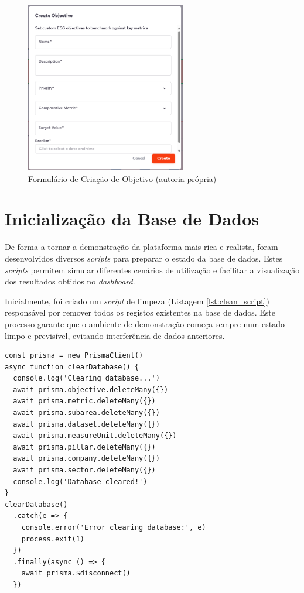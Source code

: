 \begin{figure}[H]
    \centering
    \includegraphics[width=2.75in,keepaspectratio]{frontmatter/assets/platform_prints/objetives/objective_creation.png}
    \caption{Formulário de Criação de Objetivo (autoria própria)}
    \label{fig:objective_creation}
\end{figure}

\section{Inicialização da Base de Dados}

De forma a tornar a demonstração da plataforma mais rica e realista, foram desenvolvidos diversos \textit{scripts} para preparar o estado da base de dados. Estes \textit{scripts} permitem simular diferentes cenários de utilização e facilitar a visualização dos resultados obtidos no \textit{dashboard}.

Inicialmente, foi criado um \textit{script} de limpeza (Listagem \ref{lst:clean_script}) responsável por remover todos os registos existentes na base de dados. Este processo garante que o ambiente de demonstração começa sempre num estado limpo e previsível, evitando interferência de dados anteriores.

\begin{lstlisting}[style=customts, caption={\textit{Script} de limpeza da Base de Dados}, label={lst:clean_script}]
const prisma = new PrismaClient()
async function clearDatabase() {
  console.log('Clearing database...')
  await prisma.objective.deleteMany({})
  await prisma.metric.deleteMany({})
  await prisma.subarea.deleteMany({})
  await prisma.dataset.deleteMany({})
  await prisma.measureUnit.deleteMany({})
  await prisma.pillar.deleteMany({})
  await prisma.company.deleteMany({})
  await prisma.sector.deleteMany({})
  console.log('Database cleared!')
}
clearDatabase()
  .catch(e => {
    console.error('Error clearing database:', e)
    process.exit(1)
  })
  .finally(async () => {
    await prisma.$disconnect()
  })
\end{lstlisting}


